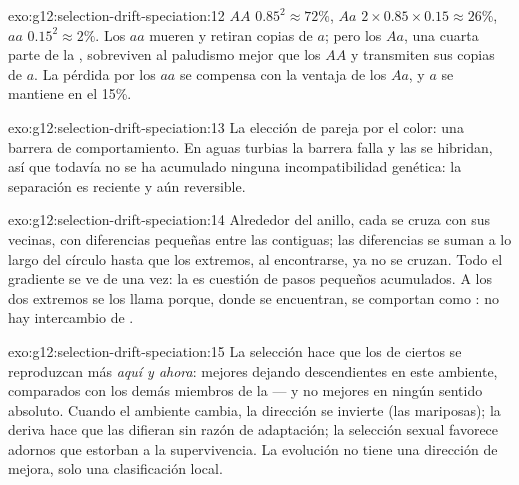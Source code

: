 \begin{solution}{exo:g12:selection-drift-speciation:12}
$AA$ $0.85^2 \approx 72\%$, $Aa$ $2 \times 0.85 \times 0.15 \approx
26\%$, $aa$ $0.15^2 \approx 2\%$. Los $aa$ mueren y retiran copias de
$a$; pero los $Aa$, una cuarta parte de la , sobreviven al
paludismo mejor que los $AA$ y transmiten sus copias de $a$. La pérdida
por los $aa$ se compensa con la ventaja de los $Aa$, y $a$ se mantiene
en el 15\%.
\end{solution}

\begin{solution}{exo:g12:selection-drift-speciation:13}
La elección de pareja por el color: una barrera de comportamiento. En
aguas turbias la barrera falla y las  se hibridan, así que
todavía no se ha acumulado ninguna incompatibilidad genética: la
separación es reciente y aún reversible.
\end{solution}

\begin{solution}{exo:g12:selection-drift-speciation:14}
Alrededor del anillo, cada  se cruza con sus vecinas, con
diferencias pequeñas entre las contiguas; las diferencias se suman a lo
largo del círculo hasta que los extremos, al encontrarse, ya no se
cruzan. Todo el gradiente se ve de una vez: la  es cuestión
de pasos pequeños acumulados. A los dos extremos se los llama 
porque, donde se encuentran, se comportan como : no hay
intercambio de .
\end{solution}

\begin{solution}{exo:g12:selection-drift-speciation:15}
La selección hace que los  de ciertos  se reproduzcan
más \emph{aquí y ahora}: mejores dejando descendientes en este
ambiente, comparados con los demás miembros de la  --- y no
mejores en ningún sentido absoluto. Cuando el ambiente cambia, la
dirección se invierte (las mariposas); la deriva hace que las
 difieran sin razón de adaptación; la selección sexual
favorece adornos que estorban a la supervivencia. La evolución no tiene
una dirección de mejora, solo una clasificación local.
\end{solution}

